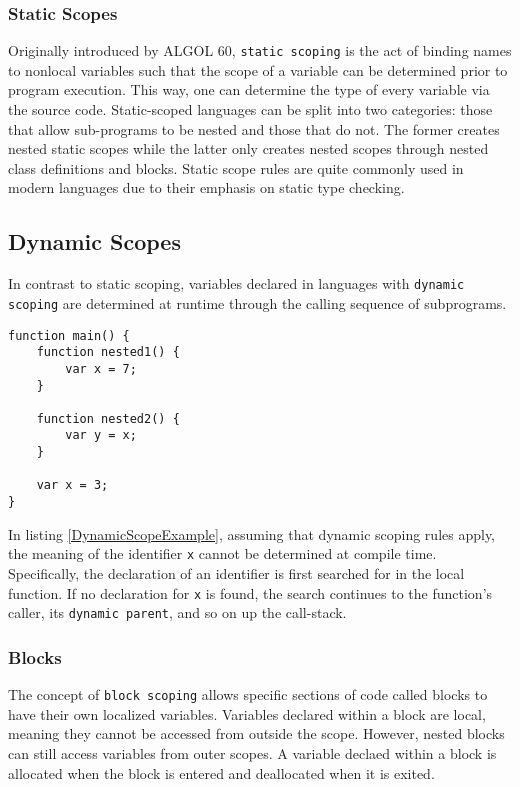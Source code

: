 \subsubsection{Static Scopes}
Originally introduced by ALGOL 60, \texttt{static scoping} is the act of binding names to nonlocal variables such that the scope of a variable
can be determined prior to program execution. This way, one can determine the type of every variable via the source code.
Static-scoped languages can be split into two categories: those that allow sub-programs to be nested and those that do not.
The former creates nested static scopes while the latter only creates nested scopes through nested class definitions and blocks.
Static scope rules are quite commonly used in modern languages due to their emphasis on static type checking.\cite{sebesta_concepts_2016}

\subsection{Dynamic Scopes}
In contrast to static scoping, variables declared in languages with \texttt{dynamic scoping} are determined at runtime through the calling sequence of subprograms.

\begin{lstlisting}[caption={Example of dynamic scoping}, label={lst:DynamicScopeExample}]
function main() {
	function nested1() {
		var x = 7;
	}
	
	function nested2() {
		var y = x;
	}

	var x = 3;
}
\end{lstlisting}

In listing \ref{DynamicScopeExample}, assuming that dynamic scoping rules apply, the meaning of the identifier \texttt{x} cannot be determined at compile time.
Specifically, the declaration of an identifier is first searched for in the local function.
If no declaration for \texttt{x} is found, the search continues to the function's caller, its \texttt{dynamic parent}, and so on up the call-stack.\cite{sebesta_concepts_2016}

\subsubsection{Blocks}
The concept of \texttt{block scoping} allows specific sections of code called blocks to have their own localized variables.
Variables declared within a block are local, meaning they cannot be accessed from outside the scope. However, nested blocks can still access variables from outer scopes.
A variable declaed within a block is allocated when the block is entered and deallocated when it is exited.\cite{sebesta_concepts_2016}

